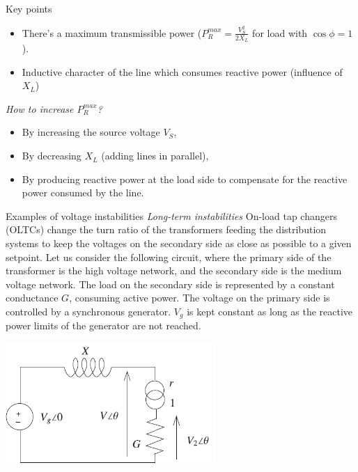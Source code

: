 \begin{frame}{Key points}
\begin{itemize}
    \item There's a maximum transmissible power ($P_{R}^{max} = \frac{V_S^2}{2 X_L}$ for load with $\cos \phi = 1$).
    \item Inductive character of the line which consumes reactive power (influence of $X_L$)
\end{itemize}
\emph{How to increase $P_{R}^{max}$?}
\begin{itemize}
    \item By increasing the source voltage $V_S$,
    \item By decreasing $X_L$ (adding lines in parallel),
    \item By producing reactive power at the load side to compensate for the reactive power consumed by the line.
\end{itemize}
\end{frame}

\begin{frame}{Examples of voltage instabilities}
\emph{Long-term instabilities}
On-load tap changers (OLTCs) change the turn ratio of the transformers feeding the distribution systems to keep the voltages on the secondary side as close as possible to a given setpoint.
Let us consider the following circuit, where the primary side of the transformer is the high voltage network, and the secondary side is the medium voltage network.
The load on the secondary side is represented by a constant conductance $G$, consuming active power.
The voltage on the primary side is controlled by a synchronous generator. $V_g$ is kept constant as long as the reactive power limits of the generator are not reached.
\begin{center}
\includegraphics[width=0.6\textwidth]{images/OLTC.png}
\end{center}
\end{frame}

